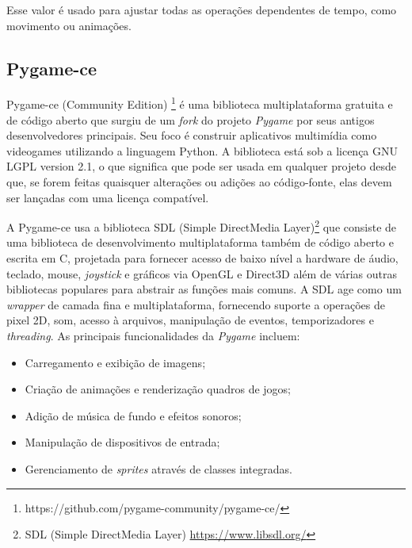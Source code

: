 Esse valor é usado para ajustar todas as operações dependentes de tempo, como movimento ou animações.

 
 
\subsection{Pygame-ce}
\label{sec:pygame-ce}
Pygame-ce (Community Edition) \footnote{https://github.com/pygame-community/pygame-ce/} é uma biblioteca multiplataforma gratuita e de código aberto que surgiu de um \textit{fork} do projeto \textit{Pygame} por seus antigos desenvolvedores principais. Seu foco é construir aplicativos multimídia como videogames utilizando a linguagem Python. A biblioteca está sob a licença GNU LGPL version 2.1, o que significa que pode ser usada em qualquer projeto desde que, se forem feitas quaisquer alterações ou adições ao código-fonte, elas devem ser lançadas com uma licença compatível.

 A Pygame-ce usa a biblioteca SDL (Simple DirectMedia Layer)\footnote{SDL (Simple DirectMedia Layer) \url{https://www.libsdl.org/}} que consiste de uma biblioteca de desenvolvimento multiplataforma também de código aberto e escrita em C, projetada para fornecer acesso de baixo nível a hardware de áudio, teclado, mouse, \textit{joystick} e gráficos via OpenGL e Direct3D além de várias outras bibliotecas populares para abstrair as funções mais comuns. A SDL age como um \textit{wrapper} de camada fina e multiplataforma, fornecendo suporte a operações de pixel 2D, som, acesso à arquivos, manipulação de eventos, temporizadores e \textit{threading}.
As principais funcionalidades da \textit{Pygame} incluem:
\begin{itemize}
    \item Carregamento e exibição de imagens;
    \item Criação de animações e renderização quadros de jogos;
    \item Adição de música de fundo e efeitos sonoros;
    \item Manipulação de dispositivos de entrada;
    \item Gerenciamento de \textit{sprites} através de classes integradas.
\end{itemize}

